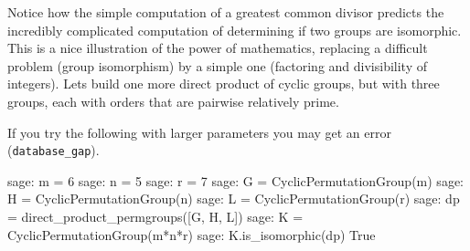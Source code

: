 %
Notice how the simple computation of a greatest common divisor predicts the incredibly complicated computation of determining if two groups are isomorphic.  This is a nice illustration of the power of mathematics, replacing a difficult problem (group isomorphism) by a simple one (factoring and divisibility of integers).  Lets build one more direct product of cyclic groups, but with three groups, each with orders that are pairwise relatively prime.\par
%
If you try the following with larger parameters you may get an error (\verb?database_gap?).
%
\begin{sageexample}
sage: m = 6
sage: n = 5
sage: r = 7
sage: G = CyclicPermutationGroup(m)
sage: H = CyclicPermutationGroup(n)
sage: L = CyclicPermutationGroup(r)
sage: dp = direct_product_permgroups([G, H, L])
sage: K = CyclicPermutationGroup(m*n*r)
sage: K.is_isomorphic(dp)
True
\end{sageexample}
%
